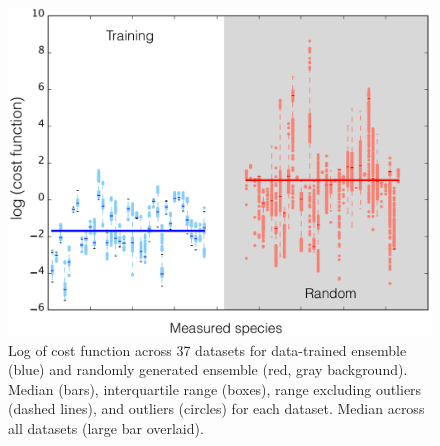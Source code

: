 \documentclass[12pt]{article}
\begin{document}
\begin{figure}[ht]
\centering
\includegraphics[width=1.00\textwidth]{./Figures/CostArray-BoxPlot.pdf}
\caption{Log of cost function across 37 datasets for data-trained ensemble (blue) and randomly generated ensemble (red, gray background). Median (bars), interquartile range (boxes), range excluding outliers (dashed lines), and outliers (circles) for each dataset. Median across all datasets (large bar overlaid).}
\label{fig:BoxPlot}
\end{figure}
\end{document}
